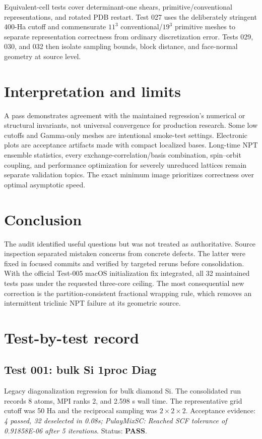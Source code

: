 \documentclass[aps,prb,preprint,superscriptaddress,longbibliography,floatfix]{revtex4-2}
\begin{document}
Equivalent-cell tests cover determinant-one shears, primitive/conventional representations, and rotated PDB restart. Test 027 uses the deliberately stringent 400-Ha cutoff and commensurate $11^3$ conventional/$19^3$ primitive meshes to separate representation correctness from ordinary discretization error. Tests 029, 030, and 032 then isolate sampling bounds, block distance, and face-normal geometry at source level.

\section{Interpretation and limits}
A pass demonstrates agreement with the maintained regression's numerical or structural invariants, not universal convergence for production research. Some low cutoffs and Gamma-only meshes are intentional smoke-test settings. Electronic plots are acceptance artifacts made with compact localized bases. Long-time NPT ensemble statistics, every exchange-correlation/basis combination, spin--orbit coupling, and performance optimization for severely unreduced lattices remain separate validation topics. The exact minimum image prioritizes correctness over optimal asymptotic speed.

\section{Conclusion}
The audit identified useful questions but was not treated as authoritative. Source inspection separated mistaken concerns from concrete defects. The latter were fixed in focused commits and verified by targeted reruns before consolidation. With the official Test-005 macOS initialization fix integrated, all 32 maintained tests pass under the requested three-core ceiling. The most consequential new correction is the partition-consistent fractional wrapping rule, which removes an intermittent triclinic NPT failure at its geometric source.

\appendix
\section{Test-by-test record}
\subsection{Test 001: bulk Si 1proc Diag}
Legacy diagonalization regression for bulk diamond Si. The consolidated run records 8 atoms, MPI ranks 2, and 2.598 s wall time. The representative grid cutoff was 50 Ha and the reciprocal sampling was $2\times2\times2$. Acceptance evidence: \emph{4 passed, 32 deselected in 0.08s; PulayMixSC: Reached SCF tolerance of 0.91858E-06 after 5 iterations}. Status: \textbf{PASS}.
\end{document}

